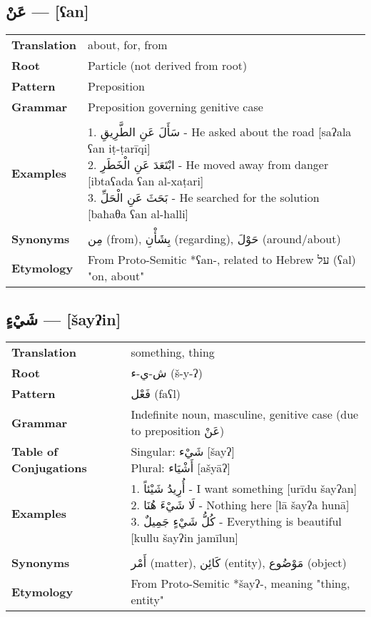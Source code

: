 \documentclass[letter,12pt]{article}
\begin{document}
\subsection{\textarabic{عَنْ} — [ʕan]}
\begin{tabular}{p{3cm}p{10cm}}
\toprule

\textbf{Translation} & about, for, from \\
\textbf{Root} & Particle (not derived from root) \\
\textbf{Pattern} & Preposition \\
\textbf{Grammar} & Preposition governing genitive case \\
\midrule \\
\textbf{Examples} & \makecell[l]{\parbox{9.5cm}{
1. \textarabic{سَأَلَ عَنِ الطَّرِيقِ} - He asked about the road [saʔala ʕan iṭ-ṭarīqi]\\
2. \textarabic{ابْتَعَدَ عَنِ الْخَطَرِ} - He moved away from danger [ibtaʕada ʕan al-xaṭari]\\
3. \textarabic{بَحَثَ عَنِ الْحَلِّ} - He searched for the solution [baħaθa ʕan al-ħalli]
} } \\
\midrule \\
\textbf{Synonyms} & \textarabic{مِن} (from), \textarabic{بِشَأْنِ} (regarding), \textarabic{حَوْلَ} (around/about) \\
\textbf{Etymology} & From Proto-Semitic *ʕan-, related to Hebrew \texthebrew{על} (ʕal) "on, about" \\
\bottomrule
\end{tabular}

\subsection{\textarabic{شَيْءٍ} — [šayʔin]}
\begin{tabular}{p{3cm}p{10cm}}
\toprule

\textbf{Translation} & something, thing \\
\textbf{Root} & \textarabic{ش-ي-ء} (š-y-ʔ) \\
\textbf{Pattern} & \textarabic{فَعْل} (faʕl) \\
\textbf{Grammar} & Indefinite noun, masculine, genitive case (due to preposition \textarabic{عَنْ}) \\
\textbf{Table of Conjugations} & \makecell[l]{
Singular: \textarabic{شَيْء} [šayʔ]\\
Plural: \textarabic{أَشْيَاء} [ašyāʔ]
} \\
\textbf{Examples} & \makecell[l]{\parbox{9.5cm}{
1. \textarabic{أُرِيدُ شَيْئاً} - I want something [urīdu šayʔan]\\
2. \textarabic{لَا شَيْءَ هُنَا} - Nothing here [lā šayʔa hunā]\\
3. \textarabic{كُلُّ شَيْءٍ جَمِيلٌ} - Everything is beautiful [kullu šayʔin jamīlun]
}} \\
\midrule \\
\textbf{Synonyms} & \textarabic{أَمْر} (matter), \textarabic{كَائِن} (entity), \textarabic{مَوْضُوع} (object) \\
\textbf{Etymology} & From Proto-Semitic *šayʔ-, meaning "thing, entity" \\
\bottomrule
\end{tabular}
\end{document}
